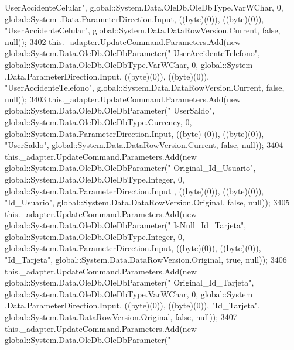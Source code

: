 \begin{DoxyCode}
{      UserAccidenteCelular"}, global::System.Data.OleDb.OleDbType.VarWChar, 0, global::System
      .Data.ParameterDirection.Input, ((byte)(0)), ((byte)(0)), \textcolor{stringliteral}{"UserAccidenteCelular"}, global::System.Data.DataRowVersion.Current, \textcolor{keyword}{false}, 
      null));
3402             this.\_adapter.UpdateCommand.Parameters.Add(\textcolor{keyword}{new} global::System.Data.OleDb.OleDbParameter(\textcolor{stringliteral}{"
      UserAccidenteTelefono"}, global::System.Data.OleDb.OleDbType.VarWChar, 0, global::System
      .Data.ParameterDirection.Input, ((byte)(0)), ((byte)(0)), \textcolor{stringliteral}{"UserAccidenteTelefono"}, global::System.Data.DataRowVersion.Current, \textcolor{keyword}{false}, 
      null));
3403             this.\_adapter.UpdateCommand.Parameters.Add(\textcolor{keyword}{new} global::System.Data.OleDb.OleDbParameter(\textcolor{stringliteral}{"
      UserSaldo"}, global::System.Data.OleDb.OleDbType.Currency, 0, global::System.Data.ParameterDirection.Input, ((byte)
      (0)), ((byte)(0)), \textcolor{stringliteral}{"UserSaldo"}, global::System.Data.DataRowVersion.Current, \textcolor{keyword}{false}, null));
3404             this.\_adapter.UpdateCommand.Parameters.Add(\textcolor{keyword}{new} global::System.Data.OleDb.OleDbParameter(\textcolor{stringliteral}{"
      Original\_Id\_Usuario"}, global::System.Data.OleDb.OleDbType.Integer, 0, global::System.Data.ParameterDirection.Input
      , ((byte)(0)), ((byte)(0)), \textcolor{stringliteral}{"Id\_Usuario"}, global::System.Data.DataRowVersion.Original, \textcolor{keyword}{false}, null));
3405             this.\_adapter.UpdateCommand.Parameters.Add(\textcolor{keyword}{new} global::System.Data.OleDb.OleDbParameter(\textcolor{stringliteral}{"
      IsNull\_Id\_Tarjeta"}, global::System.Data.OleDb.OleDbType.Integer, 0, global::System.Data.ParameterDirection.Input, 
      ((byte)(0)), ((byte)(0)), \textcolor{stringliteral}{"Id\_Tarjeta"}, global::System.Data.DataRowVersion.Original, \textcolor{keyword}{true}, null));
3406             this.\_adapter.UpdateCommand.Parameters.Add(\textcolor{keyword}{new} global::System.Data.OleDb.OleDbParameter(\textcolor{stringliteral}{"
      Original\_Id\_Tarjeta"}, global::System.Data.OleDb.OleDbType.VarWChar, 0, global::System
      .Data.ParameterDirection.Input, ((byte)(0)), ((byte)(0)), \textcolor{stringliteral}{"Id\_Tarjeta"}, global::System.Data.DataRowVersion.Original, \textcolor{keyword}{false}, null));
3407             this.\_adapter.UpdateCommand.Parameters.Add(\textcolor{keyword}{new} global::System.Data.OleDb.OleDbParameter(\textcolor{stringliteral}{"
}
\end{DoxyCode}

